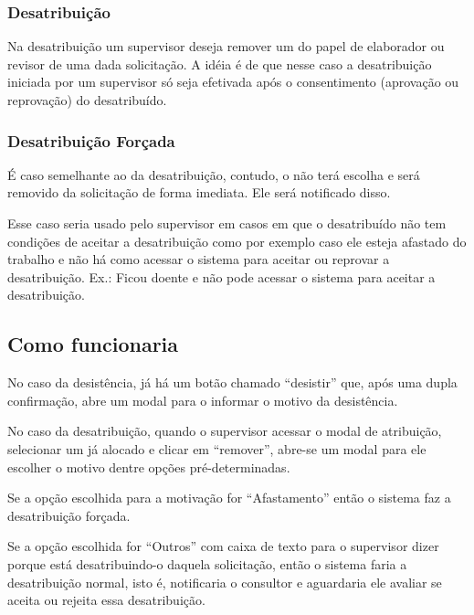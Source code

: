 \subsubsection{Desatribuição}

Na desatribuição um supervisor deseja remover um \CL do papel de elaborador ou revisor de uma dada solicitação. A idéia é de que nesse caso a desatribuição iniciada por um supervisor só seja efetivada após o consentimento (aprovação ou reprovação) do \CL desatribuído.

\subsubsection{Desatribuição Forçada}

É caso semelhante ao da desatribuição, contudo, o \CL não terá escolha e será removido da solicitação de forma imediata. Ele será notificado disso.

Esse caso seria usado pelo supervisor em casos em que o \CL desatribuído não tem condições de aceitar a desatribuição como por exemplo caso ele esteja afastado do trabalho e não há como acessar o sistema para aceitar ou reprovar a desatribuição. Ex.: Ficou doente e não pode acessar o sistema para aceitar a desatribuição.

\subsection{Como funcionaria}

No caso da desistência, já há um botão chamado ``desistir'' que, após uma dupla confirmação, abre um modal para o \CL informar o motivo da desistência.

No caso da desatribuição, quando o supervisor acessar o modal de atribuição, selecionar um \CL já alocado e clicar em ``remover'', abre-se um modal para ele escolher o motivo dentre opções pré-determinadas.

Se a opção escolhida para a motivação for ``Afastamento'' então o sistema faz a desatribuição forçada.

Se a opção escolhida for ``Outros'' com caixa de texto para o supervisor dizer porque está desatribuindo-o daquela solicitação, então o sistema faria a desatribuição normal, isto é, notificaria o consultor e aguardaria ele avaliar se aceita ou rejeita essa desatribuição.











 













